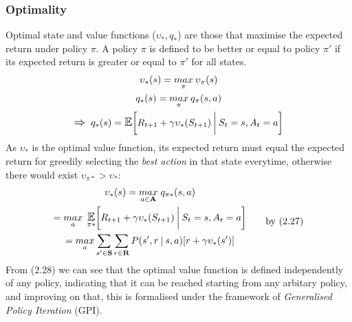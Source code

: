 \subsubsection{Optimality}
Optimal state and value functions ($\upsilon_*, q_*$) are those that maximise the expected return under policy
$\pi$. A policy $\pi$ is defined to be better or equal to policy $\pi '$ if its expected
return is greater or equal to $\pi '$ for all states.\\
\begin{equation}
    \begin{gathered}
        \upsilon_*(s) = \underset{\pi}{max}\: \upsilon_\pi(s) \\
        q_*(s) = \underset{\pi}{max}\: q_\pi(s,a) \\
        \mathlarger{\Rightarrow} \;\; q_*(s) = \E \biggl [ R_{t+1} + \gamma \upsilon_*(S_{t+1}) \: \biggl | \: S_t = s, A_t = a \biggl ]
    \end{gathered}
\end{equation}
As $\upsilon_*$ is the optimal value function, its expected return must equal the expected
return for greedily selecting the \emph{best action} in that state everytime, otherwise there would exist $\upsilon_{\pi*} > \upsilon_*$:
\begin{equation}
    \begin{gathered}
        \upsilon_*(s) = \underset{a \in \mathbf{A}}{max} \; q_{\pi*}(s,a) \\
        = \underset{a}{max} \; \E_{\pi*} \Condition{R_{t+1} + \gamma \upsilon_*(S_{t+1})}{S_t =s, A_t = a}  \\
        = \underset{a}{max} \sum_{s' \in \mathbf{S}} \sum_{r \in \mathbf{R}}P(s',r \:| \:s,a)[r +\gamma \upsilon_*(s')]
    \end{gathered}
    \qquad \text{by (2.27)}
\end{equation}
From (2.28) we can see that the optimal value function is defined independently of any policy, indicating that
it can be reached starting from any arbitary policy, and improving on that, this is formalised under the
framework of \emph{Generalised Policy Iteration} (GPI).

